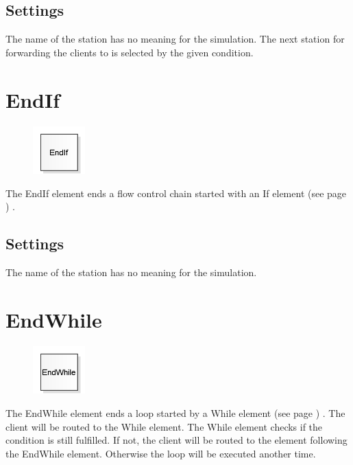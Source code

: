 \subsection*{Settings}

The name of the station has no meaning for the simulation.
The next station for forwarding the clients to is selected by the given condition.


\section{EndIf}
\label{ref:ModelElementLogicEndIf}

\begin{figure}
\vspace{-22pt}
\includegraphics[width=2cm]{imageModelElementLogicEndIf.png}
\vspace{-22pt}
\end{figure}

The EndIf element ends a flow control chain
started with an
If element (see page \pageref{ref:ModelElementLogicEndIf}) .

\subsection*{Settings}

The name of the station has no meaning for the simulation.


\section{EndWhile}
\label{ref:ModelElementLogicEndWhile}

\begin{figure}
\vspace{-22pt}
\includegraphics[width=2cm]{imageModelElementLogicEndWhile.png}
\vspace{-22pt}
\end{figure}

The EndWhile element ends a loop started by a
While element (see page \pageref{ref:ModelElementLogicWhile}) .
The client will be routed to the While element.
The While element checks if the condition is still
fulfilled. If not, the client will be routed to the
element following the EndWhile element. Otherwise
the loop will be executed another time.


